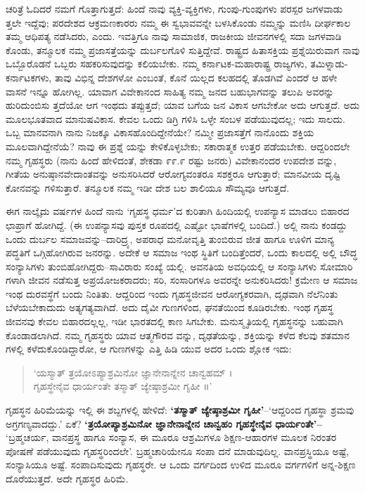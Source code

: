 ಚರಿತ್ರೆ ಓದಿದರೆ ನಮಗೆ ಗೊತ್ತಾಗುತ್ತದೆ: ಹಿಂದೆ ನಾವು ವ್ಯಕ್ತಿ-ವ್ಯಕ್ತಿಗಳು, ಗುಂಪು-ಗುಂಪುಗಳು ಪರಸ್ಪರ ಜಗಳವಾಡು ತ್ತಲೇ ಇದ್ದೆವು; ಪರದೇಶದ ಆಕ್ರಮಣಕಾರರು ನಮ್ಮ ಈ ಸ್ವಭಾವವನ್ನೇ ಬಳಸಿಕೊಂಡು ನಮ್ಮನ್ನು ಮಣಿಸಿ ದೀರ್ಘಕಾಲ ತಮ್ಮ ಆಧಿಪತ್ಯ ನಡೆಸಿದರು, ಎಂದು. ಇವತ್ತಿಗೂ ನಾವು ಸಾಮಾಜಿಕ, ರಾಜಕೀಯ ಜೀವನಗಳಲ್ಲಿ ಸದಾ ಜಗಳವಾಡಿ ಕೊಂಡು, ತನ್ಮೂಲಕ ನಮ್ಮ ಪ್ರಜಾಸತ್ತೆಯನ್ನು ದುರ್ಬಲಗೊಳಿ ಸುತ್ತಿದ್ದೇವೆ. ರಾಷ್ಟ್ರದ ಹಿತಾಸಕ್ತಿಯ ಪ್ರಶ್ನೆಯಿರುವಾಗ ನಾವು ಒಬ್ಬೊರೊಡನೆ ಒಬ್ಬರು ಸಹಕರಿಸುವುದನ್ನು ಕಲಿಯಬೇಕು. ನಮ್ಮ ಕರ್ನಾಟಕ-ಮಹಾರಾಷ್ಟ್ರ ರಾಜ್ಯಗಳು, ತಮಿಳ್ನಾಡು- ಕರ್ನಾಟಕಗಳು, ತಾವು ವಿಭಿನ್ನ ದೇಶಗಳೋ ಎಂಬಂತೆ, ಕೊನೆ ಯಿಲ್ಲದ ಕಲಹದಲ್ಲಿ ತೊಡಗಿವೆ ಎಂದರೆ ಆ ಹಳೇ ವಾಸನೆ ಇನ್ನೂ ಹೋಗಿಲ್ಲ. ಯಾವಾಗ ವಿವೇಕಾನಂದ ಸಾಹಿತ್ಯ ನಮ್ಮ ಜನದ ಬಹುಭಾಗವನ್ನು ತಲುಪಿ ಅವರನ್ನು ಹುರಿದುಂಬಿಸು ತ್ತದೆಯೋ ಆಗ ಇಂಥದು ತಪ್ಪುತ್ತದೆ; ಯಾವ ಬಗೆಯ ಜನ ವಿಕಾಸ ಆಗಬೇಕೋ ಅದು ಆಗುತ್ತದೆ. ಅದು ಮೂಲಭೂತವಾದ ಮಾನುಷವಿಕಾಸ. ಕೇವಲ ಒಂದು ಡಿಗ್ರಿ ಗಳಿಸಿ ಒಳ್ಳೇ ಸಂಬಳ ಪಡೆಯುವುದಲ್ಲ; ಇದು ಸಾಲದು. ಒಬ್ಬ ಮಾನವನಾಗಿ ನಾನು ನಿಜಕ್ಕೂ ವಿಕಾಸಹೊಂದಿದ್ದೇನೆಯೇ? ನಮ್ಮೀ ಪ್ರಜಾಸತ್ತೆಗೆ ನಾನೊಂದು ಶಕ್ತಿಯ ಮೂಲವಾಗಿದ್ದೇನೆಯೆ? ನಾವು ಈ ಪ್ರಶ್ನೆ ಯನ್ನು ಕೇಳಿಕೊಳ್ಳಬೇಕು; ಸಕಾರಾತ್ಮಕ ಉತ್ತರ ಪಡೆಯಬೇಕು. ಆದ್ದರಿಂದಲೇ ನಮ್ಮ ಗೃಹಸ್ಥರು (ನಾನು ಹಿಂದೆ ಹೇಳಿದಂತೆ, ಶೇಕಡಾ ೯೯.೯ ರಷ್ಟು ಜನರು) ವಿವೇಕಾನಂದರ ಉಪದೇಶ ವನ್ನು, ಗೀತೆಯ ಅನುಷ್ಠಾನವೇದಾಂತವನ್ನು ಅನುಸರಿಸಿದರೆ ಆರೋಗ್ಯವಂತರೂ ಸಶಕ್ತರೂ ಆಗುತ್ತಾರೆ; ಮಾನವೀಯ ದೃಷ್ಟಿ ಕೋನವನ್ನು ಗಳಿಸುತ್ತಾರೆ. ತನ್ಮೂಲಕ ನಮ್ಮ ಇಡೀ ದೇಶ ಬಲ ಶಾಲಿಯೂ ಸೌಮ್ಯವೂ ಆಗುತ್ತದೆ.

ಈಗ ನಾಲ್ಕೈದು ವರ್ಷಗಳ ಹಿಂದೆ ನಾನು ‘ಗೃಹಸ್ಥ ಧರ್ಮ’ದ ಕುರಿತಾಗಿ ಹಿಂದಿಯಲ್ಲಿ ಉಪನ್ಯಾಸ ಮಾಡಲು ಬಿಹಾರದ ಛಾಪ್ರಾಗೆ ಹೋಗಿದ್ದೆ. (ಈ ಉಪನ್ಯಾಸವು ಪುಸ್ತಕ ರೂಪದಲ್ಲಿ ಎಷ್ಟೋ ಭಾಷೆಗಳಲ್ಲಿ ಬಂದಿದೆ.) ಅಲ್ಲಿ ನಾನು ಕಂಡದ್ದು ಒಂದು ದುರ್ಬಲ ಸಮಾಜವನ್ನು–ದಾರಿದ್ರ್ಯ, ಅಪರಾಧ ಮನೋವೃತ್ತಿ ತುಂಬಿರುವ ಜೀತ ಹಾಗೂ ಊಳಿಗ ಮಾನ್ಯ ಪದ್ಧತಿಗೆ ಒಗ್ಗಿಹೋಗಿರುವ ಜನರನ್ನು. ಅದೇಕೆ ಆ ಸಮಾಜ ಇಂಥ ಸ್ಥಿತಿಗೆ ಬಂದಿತ್ತೆಂದರೆ, ಒಂದು ಕಾಲದಲ್ಲಿ ಅಲ್ಲಿ ಬೌದ್ಧ ಸಂನ್ಯಾಸಿಗಳು ತುಂಬಿಹೋಗಿದ್ದರು–ಸಾವಿರಾರು ಸಂಖ್ಯೆ ಯಲ್ಲಿ. ಅವನತಿಯ ಅವಧಿಯಲ್ಲಿ ಆ ಸಂನ್ಯಾಸಿಗಳು ಸೋಮಾರಿ ಗಳಾಗಿ ಜೀವನ ನಡೆಸುತ್ತ ಅಪ್ರಯೋಜಕರಾದರು; ಸರಿ, ಸಂಸಾರಿಗಳೂ ಅವರನ್ನೇ ಅನುಕರಿಸಿದರು! ಕ್ರಮೇಣ ಆ ಸಮಾಜ ಇಂಥ ದುರವಸ್ಥೆಗೆ ಬಂದು ನಿಂತಿತು. ಆದ್ದರಿಂದ ಇಂದು ಗೃಹಸ್ಥಜೀವನ ಆರೋಗ್ಯಕರವಾಗಿ, ದೃಢವಾಗಿ ನೆಲೆನಿಂತು ಬೆಳೆಯಬೇಕಾದುದು ಅತ್ಯಗತ್ಯವಾಗಿದೆ. ಅದು ದೈವೀ ಗುಣಗಳಿಂದ, ಘನತೆಯಿಂದ ಕೂಡಿರಬೇಕು. ಇಂಥ ಗೃಹಸ್ಥ ಜೀವನವು ಕೇವಲ ಬಿಹಾರದಲ್ಲಲ್ಲ, ಇಡೀ ಭಾರತದಲ್ಲಿ ಕಾಣ ಸಿಗಬೇಕು. ಮನುಸ್ಮೃತಿಯಲ್ಲಿ ಗೃಹಸ್ಥನನ್ನು ಬಹುವಾಗಿ ಕೊಂಡಾಡಲಾಗಿದೆ. ನಮ್ಮ ಗೃಹಸ್ಥರು ಯಾವ ಆತ್ಮಗೌರವ ವನ್ನು, ದೃಢತೆಯನ್ನು, ಶಕ್ತಿಯನ್ನು ಕಳೆದ ಕೆಲವು ಶತಮಾನ ಗಳಲ್ಲಿ ಕಳೆದುಕೊಂಡಿದ್ದಾರೋ, ಆ ಗುಣಗಳನ್ನು ಎತ್ತಿ ಹಿಡಿ ಯುವ ಅದರ ಒಂದು ಶ್ಲೋಕ ಇದು:

\begin{verse}
‘ಯಸ್ಮಾತ್ ತ್ರಯೋಽಪ್ಯಾಶ್ರಮಿನೋ ಜ್ಞಾನೇನಾನ್ನೇನ ಚಾನ್ವಹಮ್ ।\\ಗೃಹಸ್ಥೇನೈವ ಧಾರ್ಯಂತೇ ತಸ್ಮಾತ್ ಜ್ಯೇಷ್ಠಾಶ್ರಮೀ ಗೃಹೀ ॥’
\end{verse}

ಗೃಹಸ್ಥನ ಹಿರಿಮೆಯನ್ನು ಇಲ್ಲಿ ಈ ಶಬ್ದಗಳಲ್ಲಿ ಹೇಳಿದೆ: \textbf{‘ತಸ್ಮಾತ್ ಜ್ಯೇಷ್ಠಾಶ್ರಮೀ ಗೃಹೀ’}–‘ಆದ್ದರಿಂದ ಗೃಹಸ್ಥಾ ಶ್ರಮವು ಅಗ್ರಗಣ್ಯವಾದದ್ದು.’ ಏಕೆ? \textbf{‘ತ್ರಯೋಪ್ಯಾಶ್ರಮಿನೋ ಜ್ಞಾನೇನಾನ್ನೇನ ಚಾನ್ವಹಂ ಗೃಹಸ್ಥೇನೈವ ಧಾರ್ಯಂತೇ’–} ‘ಬ್ರಹ್ಮಚರ್ಯ, ವಾನಪ್ರಸ್ಥ ಹಾಗೂ ಸಂನ್ಯಾಸ, ಈ ಮೂರೂ ಆಶ್ರಮಿಗಳೂ ಶಿಕ್ಷಣ-ಆಹಾರಗಳ ಮೂಲಕ ನಿರಂತರ ಪೋಷಣೆ ಪಡೆಯುವುದು ಗೃಹಸ್ಥರಿಂದಲೇ’. ಬ್ರಹ್ಮಚಾರಿಯೇನೂ ಸಂಪಾ ದನೆ ಮಾಡುವುದಿಲ್ಲ. ವಾನಪ್ರಸ್ಥಿಯೂ ಅಷ್ಟೆ, ಸಂನ್ಯಾಸಿಯೂ ಅಷ್ಟೆ. ಸಂಪಾದಿಸುವುದು ಗೃಹಸ್ಥರೇ. ಆ ಒಂದು ವರ್ಗದಿಂದ ಉಳಿದ ಮೂರೂ ವರ್ಗಗಳಿಗೆ ಅನ್ನ-ಶಿಕ್ಷಣ ದೊರೆಯುತ್ತದೆ. ಅದೇ ಗೃಹಸ್ಥರ ಹಿರಿಮೆ.

